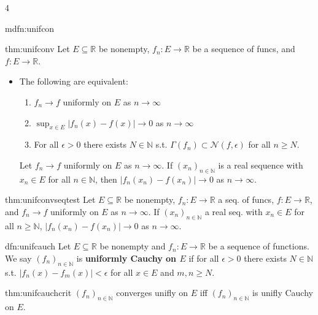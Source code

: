 \documentclass[landscape, 8pt]{extarticle}
\begin{document}
\begin{multicols*}{4}
\begin{mdfn}{mdfn:unifcon}{ }
		\end{mdfn}
		
		
		\begin{mthm}{thm:unifconv}{ }
		Let $E \subseteq \mathbb{R}$ be nonempty, $f_n : E \to \mathbb{R}$ be a sequence of funcs, and $f: E \to \mathbb{R}$.
		\begin{itemize}
			\item The following are equivalent:
			\begin{enumerate}[label=(\arabic*)]
				\item $f_n \to f$ uniformly on $E$ as $n \to \infty$
				\item $\sup_{x\in E}\left|f_n(x) - f(x)\right| \to 0$ as $n \to \infty$
				\item For all $\epsilon > 0$ there exists $N\in \mathbb{N}$ s.t. $\Gamma(f_n) \subset \mathcal{N}(f,\epsilon)$ for all $n \ge N$.
			\end{enumerate}
			Let $f_n \to f$ uniformly on $E$ as $n \to \infty$. If $(x_n)_{n\in \mathbb{N}}$ is a real sequence with $x_n\in E$ for all $n\in \mathbb{N}$, then $\left|f_n(x_n) - f(x_n)\right| \to 0$ as $n \to \infty$.
		\end{itemize}
		
		\end{mthm}
		
		
		\begin{thm}{thm:unifconvseqtest}{ }
		Let $E \subseteq \mathbb{R}$ be nonempty, $f_n:E \to \mathbb{R}$ a seq. of funcs, $f: E \to \mathbb{R}$, and $f_n \to f$ uniformly on $E$ as $n \to \infty$. If $(x_n)_{n\in \mathbb{N}}$ a real seq. with $x_n\in E$ for all $n \ge \mathbb{N}$, $\left|f_n(x_n) - f(x_n)\right| \to 0$ as $n \to \infty$.
		
		\end{thm}
		
		
		
		\begin{dfn}{dfn:unifcauch}{ }
		Let $E \subseteq \mathbb{R}$ be nonempty and $f_n : E \to \mathbb{R}$ be a sequence of functions. We say $(f_n)_{n\in \mathbb{N}}$ is \textbf{uniformly Cauchy on $E$} if for all $\epsilon > 0$ there exists $N\in \mathbb{N}$ s.t. $\left|f_n(x) - f_m(x)\right| < \epsilon$ for all $x\in E$ and $m, n \ge N$.
		
		\end{dfn}
		
		
		\begin{mthm}{thm:unifcauchcrit}{ }
		$(f_n)_{n\in \mathbb{N}}$ converges unifly on $E$ iff $(f_n)_{n\in \mathbb{N}}$ is unifly Cauchy on $E$.
		

\end{mthm}
\end{multicols*}
\end{document}
